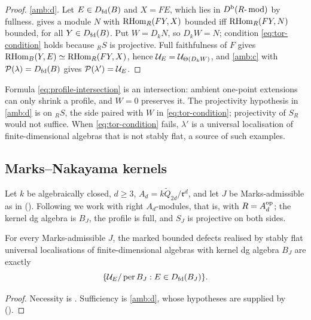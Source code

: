 \begin{proof}
\ref{amb:d}.  Let \(E\in D_{\mathrm{fd}}(B)\) and \(X=FE\), which lies in \(D^{\mathrm b}(R\text{-}\operatorname{mod})\) by fullness.   gives a module \(N\) with \(\operatorname{RHom}_R(FY,X)\) bounded iff \(\operatorname{RHom}_R(FY,N)\) bounded, for all \(Y\in D_{\mathrm{fd}}(B)\).  Put \(W=D_kN\), so \(D_kW=N\); condition \eqref{eq:tor-condition} holds because \({}_RS\) is projective.  Full faithfulness of \(F\) gives \(\operatorname{RHom}_B(Y,E)\simeq\operatorname{RHom}_R(FY,X)\), hence \(\mathcal U_E=\mathcal U_{\Theta(D_kW)}\), and \ref{amb:c} with \(\mathcal P(\lambda)=D_{\mathrm{fd}}(B)\) gives \(\mathcal P(\lambda')=\mathcal U_E\).
\end{proof}

\begin{remark}
Formula \eqref{eq:profile-intersection} is an intersection: ambient one-point extensions can only shrink a profile, and \(W=0\) preserves it.  The projectivity hypothesis in \ref{amb:d} is on \({}_RS\), the side paired with \(W\) in \eqref{eq:tor-condition}; projectivity of \(S_R\) would not suffice.  When \eqref{eq:tor-condition} fails, \(\lambda'\) is a universal localisation of finite-dimensional algebras that is not stably flat, a source of such examples.
\end{remark}

\subsection{Marks--Nakayama kernels}
Let \(k\) be algebraically closed, \(d\ge3\), \(A_d=k\widetilde Q_{2d}/\mathfrak r^d\), and let \(J\) be Marks-admissible as in ().  Following  we work with right \(A_d\)-modules, that is, with \(R=A_d^{\mathrm{op}}\); the kernel dg algebra is \(B_J\), the profile is full, and \(S_J\) is projective on both sides.

\begin{corollary}\label{cor:nakayama-profiles}
For every Marks-admissible \(J\), the marked bounded defects realised by stably flat universal localisations of finite-dimensional algebras with kernel dg algebra \(B_J\) are exactly
\[
 \{\mathcal U_E/\operatorname{per} B_J:E\in D_{\mathrm{fd}}(B_J)\}.
\]
\end{corollary}

\begin{proof}
Necessity is .  Sufficiency is \ref{amb:d}, whose hypotheses are supplied by ().
\end{proof}

